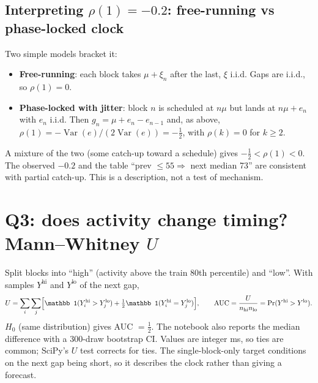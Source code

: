 \documentclass[11pt,a4paper]{article}
\newcommand{\Var}{\operatorname{Var}}
\begin{document}
\subsection{Interpreting $\rho(1)=-0.2$: free-running vs phase-locked clock}
Two simple models bracket it:
\begin{itemize}
  \item \textbf{Free-running}: each block takes $\mu+\xi_n$ after the last, $\xi$ i.i.d. Gaps are i.i.d., so $\rho(1)=0$.
  \item \textbf{Phase-locked with jitter}: block $n$ is scheduled at $n\mu$ but lands at $n\mu+e_n$ with $e_n$ i.i.d. Then $g_n=\mu+e_n-e_{n-1}$ and, as above,
        $\rho(1)=-\Var(e)/(2\Var(e))=-\tfrac12$, with $\rho(k)=0$ for $k\ge2$.
\end{itemize}
A mixture of the two (some catch-up toward a schedule) gives $-\tfrac12<\rho(1)<0$. The observed $-0.2$ and the table ``prev $\le55\Rightarrow$ next median 73'' are consistent with
partial catch-up. This is a description, not a test of mechanism.

\section{Q3: does activity change timing? Mann--Whitney $U$}
Split blocks into ``high'' (activity above the train 80th percentile) and ``low''. With samples $Y^{\text{hi}}$ and $Y^{\text{lo}}$ of the next gap,
\begin{equation}
  U=\sum_{i}\sum_{j}\Bigl[\mathbb 1(Y^{\text{hi}}_i>Y^{\text{lo}}_j)+\tfrac12\mathbb 1(Y^{\text{hi}}_i=Y^{\text{lo}}_j)\Bigr],\qquad
  \text{AUC}=\frac{U}{n_{\text{hi}}n_{\text{lo}}}=\Pr(Y^{\text{hi}}>Y^{\text{lo}}).
\end{equation}
$H_0$ (same distribution) gives AUC $=\tfrac12$. The notebook also reports the median difference with a 300-draw bootstrap CI. Values are integer ms, so ties are common;
SciPy's $U$ test corrects for ties. The single-block-only target conditions on the next gap being short, so it describes the clock rather than giving a forecast.
\end{document}
